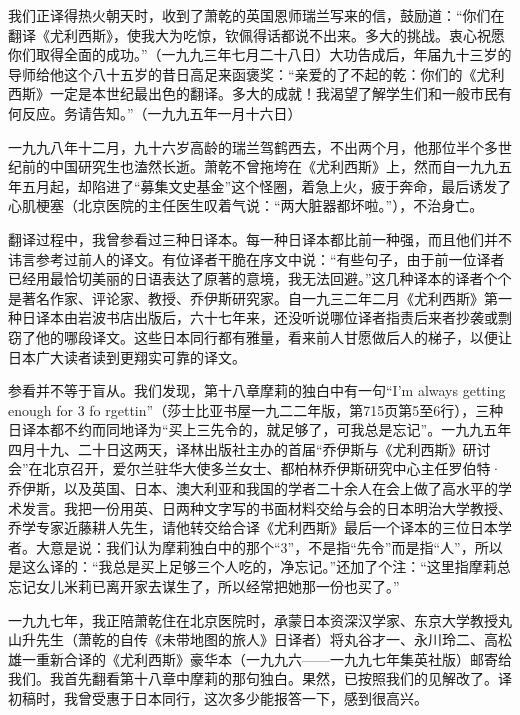 \par 我们正译得热火朝天时，收到了萧乾的英国恩师瑞兰写来的信，鼓励道：“你们在翻译《尤利西斯》，使我大为吃惊，钦佩得话都说不出来。多大的挑战。衷心祝愿你们取得全面的成功。”（一九九三年七月二十八日）大功告成后，年届九十三岁的导师给他这个八十五岁的昔日高足来函褒奖：“亲爱的了不起的乾：你们的《尤利西斯》一定是本世纪最出色的翻译。多大的成就！我渴望了解学生们和一般市民有何反应。务请告知。”（一九九五年一月十六日）
\par 一九九八年十二月，九十六岁高龄的瑞兰驾鹤西去，不出两个月，他那位半个多世纪前的中国研究生也溘然长逝。萧乾不曾拖垮在《尤利西斯》上，然而自一九九五年五月起，却陷进了“募集文史基金”这个怪圈，着急上火，疲于奔命，最后诱发了心肌梗塞（北京医院的主任医生叹着气说：“两大脏器都坏啦。”），不治身亡。
\par 翻译过程中，我曾参看过三种日译本。每一种日译本都比前一种强，而且他们并不讳言参考过前人的译文。有位译者干脆在序文中说：“有些句子，由于前一位译者已经用最恰切美丽的日语表达了原著的意境，我无法回避。”这几种译本的译者个个是著名作家、评论家、教授、乔伊斯研究家。自一九三二年二月《尤利西斯》第一种日译本由岩波书店出版后，六十七年来，还没听说哪位译者指责后来者抄袭或剽窃了他的哪段译文。这些日本同行都有雅量，看来前人甘愿做后人的梯子，以便让日本广大读者读到更翔实可靠的译文。
\par 参看并不等于盲从。我们发现，第十八章摩莉的独白中有一句“I’m always getting enough for 3 fo rgettin”（莎士比亚书屋一九二二年版，第715页第5至6行），三种日译本都不约而同地译为“买上三先令的，就足够了，可我总是忘记”。一九九五年四月十九、二十日这两天，译林出版社主办的首届“乔伊斯与《尤利西斯》研讨会”在北京召开，爱尔兰驻华大使多兰女士、都柏林乔伊斯研究中心主任罗伯特·乔伊斯，以及英国、日本、澳大利亚和我国的学者二十余人在会上做了高水平的学术发言。我把一份用英、日两种文字写的书面材料交给与会的日本明治大学教授、乔学专家近藤耕人先生，请他转交给合译《尤利西斯》最后一个译本的三位日本学者。大意是说：我们认为摩莉独白中的那个“3”，不是指“先令”而是指“人”，所以是这么译的：“我总是买上足够三个人吃的，净忘记。”还加了个注：“这里指摩莉总忘记女儿米莉已离开家去谋生了，所以经常把她那一份也买了。”
\par 一九九七年，我正陪萧乾住在北京医院时，承蒙日本资深汉学家、东京大学教授丸山升先生（萧乾的自传《未带地图的旅人》日译者）将丸谷才一、永川玲二、高松雄一重新合译的《尤利西斯》豪华本（一九九六——一九九七年集英社版）邮寄给我们。我首先翻看第十八章中摩莉的那句独白。果然，已按照我们的见解改了。译初稿时，我曾受惠于日本同行，这次多少能报答一下，感到很高兴。
